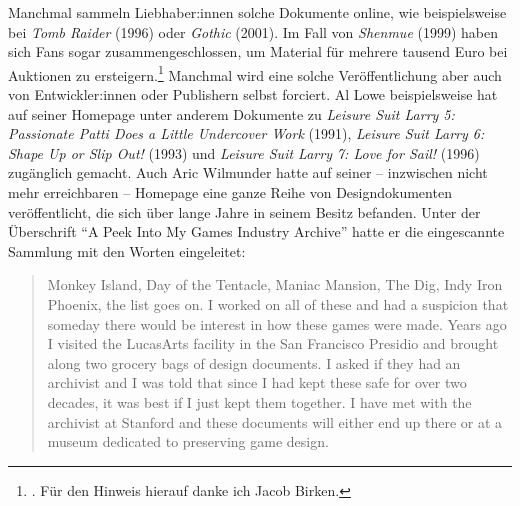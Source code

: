 \documentclass[a5paper,pagesize,numbers=noenddot]{scrbook}
\begin{document}
Manchmal sammeln Liebhaber:innen solche Dokumente online, wie beispielsweise bei \textit{Tomb Raider} (1996) oder \textit{Gothic} (2001).\autocite[Vgl.][]{core_design_tomb_raider,gothic_archive_2024}
Im Fall von \textit{Shenmue} (1999) haben sich Fans sogar zusammengeschlossen, um Material für mehrere tausend Euro bei Auktionen zu ersteigern.\footnote{\autocite[Vgl.][]{shenmue_original_2025}.
Für den Hinweis hierauf danke ich Jacob Birken.}
Manchmal wird eine solche Veröffentlichung aber auch von Entwickler:innen oder Publishern selbst forciert.
Al Lowe beispielsweise hat auf seiner Homepage unter anderem Dokumente zu \textit{Leisure Suit Larry 5: Passionate Patti Does a Little Undercover Work} (1991), \textit{Leisure Suit Larry 6: Shape Up or Slip Out!} (1993) und \textit{Leisure Suit Larry 7: Love for Sail!} (1996) zugänglich gemacht.\autocite[Vgl.][]{lowe_designs_2025}
Auch Aric Wilmunder hatte auf seiner -- inzwischen nicht mehr erreichbaren -- Homepage eine ganze Reihe von Designdokumenten veröffentlicht, die sich über lange Jahre in seinem Besitz befanden.
Unter der Überschrift \enquote{A Peek Into My Games Industry Archive} hatte er die eingescannte Sammlung mit den Worten eingeleitet:

\begin{quote}
   Monkey Island, Day of the Tentacle, Maniac Mansion, The Dig, Indy Iron Phoenix, the list goes on.
   I worked on all of these and had a suspicion that someday there would be interest in how these games were made.
   Years ago I visited the LucasArts facility in the San Francisco Presidio and brought along two grocery bags of design documents.
   I asked if they had an archivist and I was told that since I had kept these safe for over two decades, it was best if I just kept them together.
   I have met with the archivist at Stanford and these documents will either end up there or at a museum dedicated to preserving game design.\autocite{wilmunder_peek}
\end{quote}
\end{document}
